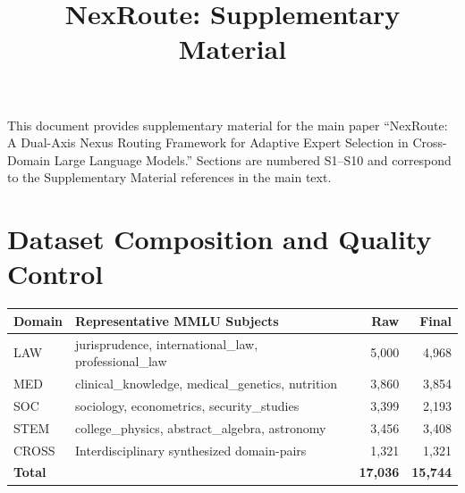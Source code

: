 \documentclass[a4paper,fleql,doubleblind]{cas-sc}
\begin{document}
\let\WriteBookmarks\relax

\title[mode=title]{NexRoute: Supplementary Material}

\author[1]{}


\maketitle

\noindent This document provides supplementary material for the main paper
``NexRoute: A Dual-Axis Nexus Routing Framework for Adaptive Expert Selection
in Cross-Domain Large Language Models.'' Sections are numbered S1--S10 and
correspond to the Supplementary Material references in the main text.

\tableofcontents

\clearpage

\section{Dataset Composition and Quality Control}
\label{supp:dataset}

\vspace{6pt plus 4pt minus 3pt}
\begin{center}
\begingroup
{}
\label{tab:data}
\begin{tabular}{llrr}
\toprule
\textbf{Domain} & \textbf{Representative MMLU Subjects} & \textbf{Raw} & \textbf{Final} \\
\midrule
LAW   & jurisprudence, international\_law, professional\_law  & 5{,}000 & 4{,}968 \\
MED   & clinical\_knowledge, medical\_genetics, nutrition      & 3{,}860 & 3{,}854 \\
SOC   & sociology, econometrics, security\_studies             & 3{,}399 & 2{,}193 \\
STEM  & college\_physics, abstract\_algebra, astronomy         & 3{,}456 & 3{,}408 \\
CROSS & Interdisciplinary synthesized domain-pairs             & 1{,}321 & 1{,}321 \\
\midrule
\textbf{Total} & & \textbf{17{,}036} & \textbf{15{,}744} \\
\bottomrule
\end{tabular}
\endgroup
\end{center}
\vspace{6pt plus 4pt minus 3pt}
\end{document}
